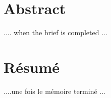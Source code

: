 \documentclass[a4paper,12pt]{report}
\theoremstyle{plain}				%
\theoremstyle{definition}				%
\begin{document}


\section*{Abstract} \label{sec:abstract}
.... when the brief is completed ...

\bigskip
{}
\section*{Résumé} \label{sec:resume}
....une fois le mémoire terminé ...

\end{document}
